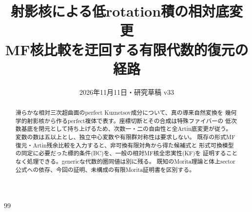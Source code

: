 \documentclass[a4paper,11pt]{ltjsarticle}
\title{射影核による低rotation積の相対底変更\\\large MF核比較を迂回する有限代数的復元の経路}
\author{}\date{2026年11月11日・研究草稿 v33}
\theoremstyle{remark}\newtheorem{remark}[theorem]{注意}\renewcommand{\proofname}{証明}
\begin{document}
\maketitle
\begin{abstract}
滑らかな相対三次超曲面のperfect Kuznetsov成分について、真の導来自然変換を
幾何学的射影核から作るperfect複体で表す。座標切断とその合成は特殊ファイバーの
低次数基底を閉元として持ち上げるため、次数一・二の自由性と全Artin底変更が従う。
変数の数は五以上とし、独立中心変数や有限群対称性は要求しない。
既存の形式MF復元・Artin残余比較を入力すると、非可換有限対角から得た候補式と
形式可換模型の同定に必要だった標的条件(BC)を、一般の相対MF核全忠実性(KF)を
証明することなく処理できる。genericな代数的圏同値は別に残る。
既知のMorita理論と体上sector公式への依存、今回の証明、未構成の有限Morita証明書を区別する。
\end{abstract}
\tableofcontents

\begin{thebibliography}{99}\end{thebibliography}
\end{document}
